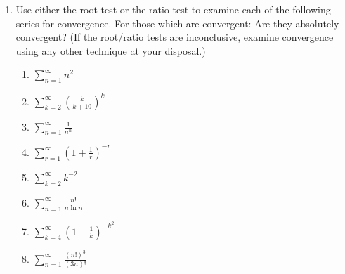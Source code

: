 \documentclass[12 pt]{article}
\newcommand{\infsum}[3]{\sum_{{#1}={#2}}^\infty {#3}}
\begin{document}
\begin{enumerate}[leftmargin=0in, rightmargin=-0.25in]
	\item Use either the root test or the ratio test to examine each of the following series for convergence. For those which are convergent: Are they absolutely convergent? (If the root/ratio tests are inconclusive, examine convergence using any other technique at your disposal.)
	\begin{multicols}{2}
		\begin{enumerate}[itemsep=0.45in]
			\item $\infsum{n}{1}{n^2}$
			\item $\infsum{k}{2}{\left(\frac{k}{k+10}\right)^k}$
			\item $\infsum{n}{1}{\frac{1}{n^n}}$
			\item $\infsum{r}{1}{\left(1+\frac{1}{r}\right)^{-r}}$
			\item $\infsum{k}{2}{k^{-2}}$
			\item $\infsum{n}{1}{\frac{n!}{n\ln{n}}}$
			\item $\infsum{k}{4}{\left(1-\frac{1}{k}\right)^{-k^2}}$
			\item $\infsum{n}{1}{\frac{(n!)^3}{(3n)!}}$
		\end{enumerate}
	\end{multicols}


\end{enumerate}
\end{document}

